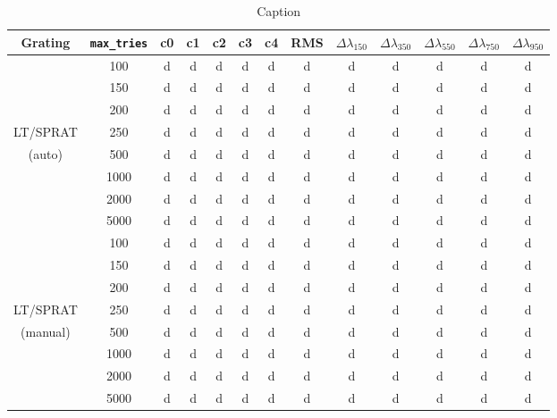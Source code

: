 \documentclass{aa}
\begin{document}
\begin{table}
    \centering
    \begin{tabular}{c|c|ccccc|c|ccccc}

        Grating & \texttt{max\_tries} & c0 & c1 & c2 & c3 & c4 & RMS & $\Delta\lambda_{150}$ & $\Delta\lambda_{350}$ & $\Delta\lambda_{550}$ & $\Delta\lambda_{750}$ & $\Delta\lambda_{950}$\\
        \hline
        \hline
          & 100 & d & d & d & d & d & d & d & d & d & d & d \\
          & 150 & d & d & d & d & d & d & d & d & d & d & d \\
          & 200 & d & d & d & d & d & d & d & d & d & d & d \\
        LT/SPRAT & 250 & d & d & d & d & d & d & d & d & d & d & d \\
        (auto) & 500 & d & d & d & d & d & d & d & d & d & d & d \\
          & 1000 & d & d & d & d & d & d & d & d & d & d & d \\
          & 2000 & d & d & d & d & d & d & d & d & d & d & d \\
          & 5000 & d & d & d & d & d & d & d & d & d & d & d \\\hline
          & 100 & d & d & d & d & d & d & d & d & d & d & d \\
          & 150 & d & d & d & d & d & d & d & d & d & d & d \\
          & 200 & d & d & d & d & d & d & d & d & d & d & d \\
        LT/SPRAT & 250 & d & d & d & d & d & d & d & d & d & d & d \\
        (manual) & 500 & d & d & d & d & d & d & d & d & d & d & d \\
          & 1000 & d & d & d & d & d & d & d & d & d & d & d \\
          & 2000 & d & d & d & d & d & d & d & d & d & d & d \\
          & 5000 & d & d & d & d & d & d & d & d & d & d & d \\\hline
    \end{tabular}
    \caption{Caption}
    \label{tab:stats}
\end{table}
\end{document}
